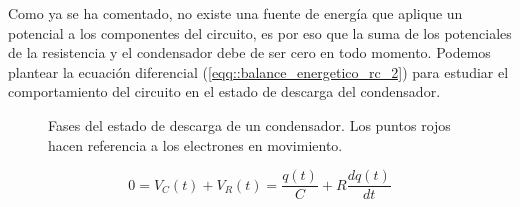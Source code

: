\documentclass[../main.tex]{subfiles}
\begin{document}
Como ya se ha comentado, no existe una fuente de energía que aplique un potencial a los componentes del circuito, es por eso que la suma de los potenciales de la resistencia y el condensador debe de ser cero en todo momento. Podemos plantear la ecuación diferencial (\ref{eqq::balance_energetico_rc_2}) para estudiar el comportamiento del circuito en el estado de descarga del condensador.


\begin{figure}[!h]
    \centering
    \caption{Fases del estado de descarga de un condensador. Los puntos rojos hacen referencia a los electrones en movimiento.}
    \label{fig::descarga_condensador}
\end{figure}

\begin{equation}
    0 = V_C(t) + V_R(t) = \frac{q(t)}{C} + R\frac{d q(t)}{d t}
    \label{eqq::balance_energetico_rc_2}
\end{equation}
\end{document}
